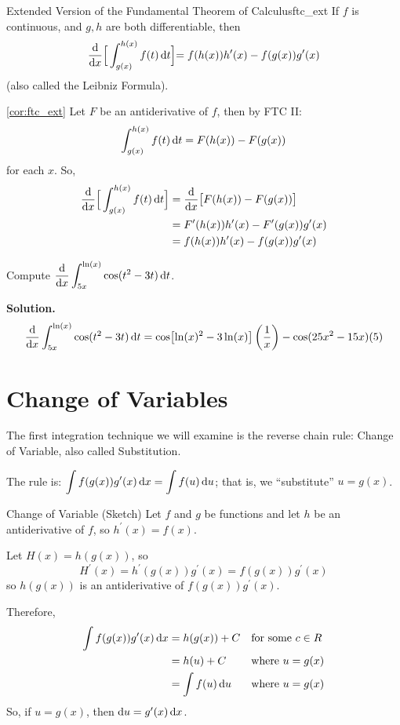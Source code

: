 \begin{Corollary}{Extended Version of the Fundamental Theorem of Calculus}{ftc_ext}
    If $ f $ is continuous, and $ g, h $ are both differentiable, then
    \[ \odv{}{x}\Bigr[\int_{g(x)}^{h(x)} f(t)\odif{t} \Bigl]
        =f(h(x))h^\prime(x)-f(g(x))g^\prime(x) \]
    (also called the Leibniz Formula).
\end{Corollary}

\begin{Proof}{\ref{cor:ftc_ext}}{}
    Let $ F $ be an antiderivative of $ f $, then by FTC II\@:
    \[ \int_{g(x)}^{h(x)} f(t)\odif{t}=F(h(x))-F(g(x)) \]
    for each $ x $. So,
    \begin{align*}
        \odv{}{x}\Bigr[\int_{g(x)}^{h(x)} f(t)\odif{t} \Bigl]
         & =\odv{}{x}\bigl[F(h(x))-F(g(x))\bigr]                \\
         & =F^\prime(h(x))h^\prime(x)-F^\prime(g(x))g^\prime(x) \\
         & =f(h(x))h^\prime(x)-f(g(x))g^\prime(x)
    \end{align*}
\end{Proof}

\begin{Example}{}{}
    Compute $ \displaystyle \odv{}{x}\int_{5x}^{\ln(x)} \cos(t^2-3t)\odif{t} $.

    \textbf{Solution.}
    \[ \odv{}{x}\int_{5x}^{\ln(x)} \cos(t^2-3t)\odif{t}
        =\cos\bigl[\ln(x)^2-3\ln(x)\bigr]\left(\frac{1}{x}\right)-\cos(25x^2-15x)(5) \]
\end{Example}

\section{Change of Variables}
The first integration technique we will examine is the reverse chain rule:
Change of Variable, also called Substitution.

The rule is:
$ \displaystyle \int f(g(x))g^\prime(x)\odif{x}=\int f(u)\odif{u}  $;
that is, we ``substitute'' $ u=g(x) $.

\begin{Proof}{Change of Variable (Sketch)}{}
    Let $ f $ and $ g $ be functions and let $ h $ be an antiderivative of $ f $,
    so $ h^\prime(x)=f(x) $.

    Let $ H(x)=h(g(x)) $, so
    \[ H^\prime(x)=h^\prime(g(x))g^\prime(x)=f(g(x))g^\prime(x) \]
    so $ h(g(x)) $ is an antiderivative of $ f(g(x))g^\prime(x) $.

    Therefore,
    \begin{align*}
        \int f(g(x))g^\prime(x)\odif{x}
         & =h(g(x))+C         &  & \text{for some }c\in\mathbb{R} \\
         & =h(u)+C            &  & \text{where $u=g(x) $}         \\
         & =\int f(u)\odif{u} &  & \text{where $u=g(x)$}
    \end{align*}
    So, if $ u=g(x) $, then $ \odif{u}=g^\prime(x)\odif{x} $.
\end{Proof}

